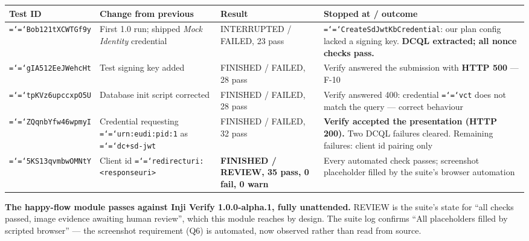 \documentclass[11pt,a4paper]{article}
\let\origtexttt\texttt
\renewcommand{\texttt}[1]{\origtexttt{\hyphenchar\font=`\-\relax #1}}
\renewcommand{\_}{\textunderscore\allowbreak}
\begin{document}
\begin{longtable}{p{2.6cm} p{4.4cm} p{3.4cm} p{4.1cm}}
\hline
\textbf{Test ID} & \textbf{Change from previous} & \textbf{Result} & \textbf{Stopped at / outcome}\\
\hline
\endhead
\texttt{Bob121tXCWTGf9y} & First 1.0 run; shipped \emph{Mock Identity} credential
& INTERRUPTED / FAILED, 23 pass & \texttt{CreateSdJwtKbCredential}: our plan config lacked a
signing key. \textbf{DCQL extracted; all nonce checks pass.}\\
\texttt{gIA512EeJWehcHt} & Test signing key added & FINISHED / FAILED, 28 pass & Verify
answered the submission with \textbf{HTTP 500} --- F-10\\
\texttt{tpKVz6upccxpO5U} & Database init script corrected & FINISHED / FAILED, 28 pass &
Verify answered 400: credential \texttt{vct} does not match the query --- correct behaviour\\
\texttt{ZQqnbYfw46wpmyI} & Credential requesting \texttt{urn:eudi:pid:1} as \texttt{dc+sd-jwt}
& FINISHED / FAILED, 32 pass & \textbf{Verify accepted the presentation (HTTP 200).} Two
DCQL failures cleared. Remaining failures: client id pairing only\\
\texttt{5KS13qvmbwOMNtY} & Client id \texttt{redirect\_uri:<response\_uri>} &
\textbf{FINISHED / REVIEW, 35 pass, 0 fail, 0 warn} & Every automated check passes; screenshot
placeholder filled by the suite's browser automation\\
\hline
\end{longtable}

\textbf{The happy-flow module passes against Inji Verify 1.0.0-alpha.1, fully unattended.}
REVIEW is the suite's state for ``all checks passed, image evidence awaiting human review'',
which this module reaches by design. The suite log confirms ``All placeholders filled by
scripted browser'' --- the screenshot requirement (Q6) is automated, now observed rather than
read from source.
\end{document}
